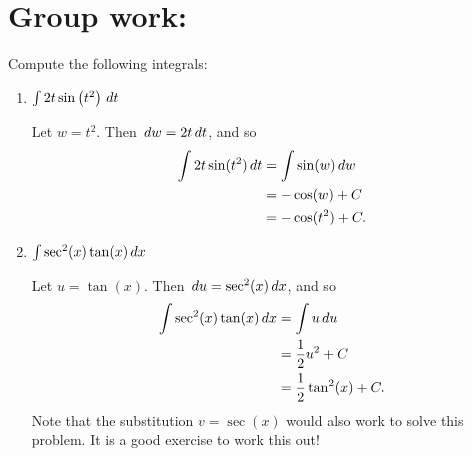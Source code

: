 \documentclass[handout,nooutcomes]{ximera}
\begin{document}
\section{Group work:}



\begin{problem}
Compute the following integrals:

	\begin{enumerate}
	
	\item  $\int 2t \sin \left( t^2 \right) \,d t$
		\begin{freeResponse}
		Let $w=t^2$.  Then $\,d w = 2t \,d t$, and so
			\begin{align*}
			\int 2t \sin(t^2) \,d t &= \int \sin(w) \,d w  \\
			&= - \cos(w) + C  \\
			&= - \cos(t^2) + C.
			\end{align*}
		\end{freeResponse}
		
		
		
	\item  $\int \sec^2(x) \tan(x) \,d x$
		\begin{freeResponse}
		Let $u = \tan(x)$.  Then $\,d u = \sec^2 (x) \,d x$, and so
			\begin{align*}
			\int \sec^2(x) \tan(x) \,d x &= \int u \,d u  \\
			&= \frac{1}{2} u^2 + C  \\
			&= \frac{1}{2} \tan^2(x) + C.
			\end{align*}
		Note that the substitution $v=\sec(x)$ would also work to solve this problem.  
		It is a good exercise to work this out!
		\end{freeResponse}
		
		
		
	\end{enumerate}
		
		
\end{problem}
\end{document}
